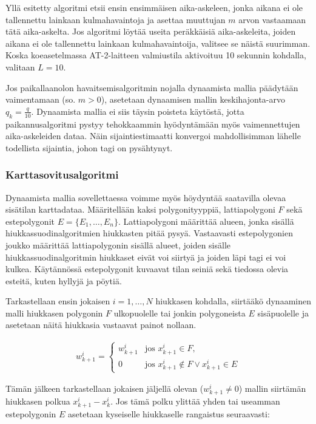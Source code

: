 \documentclass[
  12pt,
  a4paper, twoside]{book}
\begin{document}
Yllä esitetty algoritmi etsii ensin ensimmäisen aika-askeleen, jonka aikana ei ole tallennettu lainkaan kulmahavaintoja ja asettaa muuttujan \(m\) arvon vastaamaan tätä aika-askelta. Jos algoritmi löytää useita peräkkäisiä aika-askeleita, joiden aikana ei ole tallennettu lainkaan kulmahavaintoija, valitsee se näistä suurimman. Koska koeasetelmassa AT-2-laitteen valmiustila aktivoituu 10 sekunnin kohdalla, valitaan \(L=10\).

Jos paikallaanolon havaitsemisalgoritmin nojalla dynaamista mallia päädytään vaimentamaan (so. \(m>0\)), asetetaan dynaamisen mallin keskihajonta-arvo \(q_{k}=\frac{q}{10}\). Dynaamista mallia ei siis täysin poisteta käytöstä, jotta paikannusalgoritmi pystyy tehokkaammin hyödyntämään myös vaimennettujen aika-askeleiden dataa. Näin sijaintiestimaatti konvergoi mahdollisimman lähelle todellista sijaintia, johon tagi on pysähtynyt.

\subsubsection{Karttasovitusalgoritmi}\label{karttasovitusalgoritmi}

Dynaamista mallia sovellettaessa voimme myös höydyntää saatavilla olevaa sisätilan karttadataa. Määritellään kaksi polygonityyppiä, lattiapolygoni \(F\) sekä estepolygonit \(E=\{E_1,\ldots,E_n\}\). Lattiapolygoni määrittää alueen, jonka sisällä hiukkassuodinalgoritmien hiukkasten pitää pysyä. Vastaavasti estepolygonien joukko määrittää lattiapolygonin sisällä alueet, joiden sisälle hiukkassuodinalgoritmin hiukkaset eivät voi siirtyä ja joiden läpi tagi ei voi kulkea. Käytännössä estepolygonit kuvaavat tilan seiniä sekä tiedossa olevia esteitä, kuten hyllyjä ja pöytiä.

Tarkastellaan ensin jokaisen \(i=1,\ldots,N\) hiukkasen kohdalla, siirtääkö dynaaminen malli hiukkasen polygonin \(F\) ulkopuolelle tai jonkin polygoneista \(E\) sisäpuolelle ja asetetaan näitä hiukkasia vastaavat painot nollaan.

\begin{align}\label{inclusion-polygon}
\displaystyle w^i_{k+1}={\begin{cases}w^i_{k+1}&\text{jos } x^i_{k+1} \in F,\\
0& \text{jos } x^i_{k+1} \notin F \lor x^i_{k+1} \in E \end{cases}}\end{align}

Tämän jälkeen tarkastellaan jokaisen jäljellä olevan (\(w^i_{k+1} \neq 0\)) mallin siirtämän hiukkasen polkua \(x_{k+1}^i-x_{k}^i\). Jos tämä polku ylittää yhden tai useamman estepolygonin \(E\) asetetaan kyseiselle hiukkaselle rangaistus seuraavasti:
\end{document}

